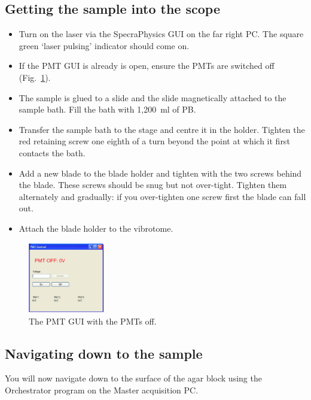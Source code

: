 \documentclass[paper=a4, fontsize=11pt]{scrartcl} %
\numberwithin{equation}{section} %
\numberwithin{figure}{section} %
\numberwithin{table}{section} %
\begin{document}
\subsection{Getting the sample into the scope}

\begin{itemize}
\item Turn on the laser via the SpecraPhysics GUI on the far right PC. 
The square green `laser pulsing' indicator should come on. 
\item If the PMT GUI is already is open, ensure the PMTs are switched off (Fig.~\ref{fig:pmt}).
\item The sample is glued to a slide and the slide magnetically attached to the sample bath. 
Fill the bath with 1,200~ml of PB. 
\item Transfer the sample bath to the stage and centre it in the holder.
Tighten the red retaining screw one eighth of a turn beyond the point at which it first contacts the bath. 
\item Add a new blade to the blade holder and tighten with the two screws behind the blade.
These screws should be snug but not over-tight. 
Tighten them alternately and gradually: if you over-tighten one screw first the blade can fall out. 
\item Attach the blade holder to the vibrotome. 
\end{itemize}

\begin{figure}[h]
\centering
\includegraphics[width=0.3\textwidth,natwidth=354,natheight=324]{PMT_GUI.png}
\caption{The PMT GUI with the PMTs off.}
\label{fig:pmt}
\end{figure}

\clearpage

\subsection{Navigating down to the sample}
You will now navigate down to the surface of the agar block using the Orchestrator program on the Master acquisition PC.
\end{document}
